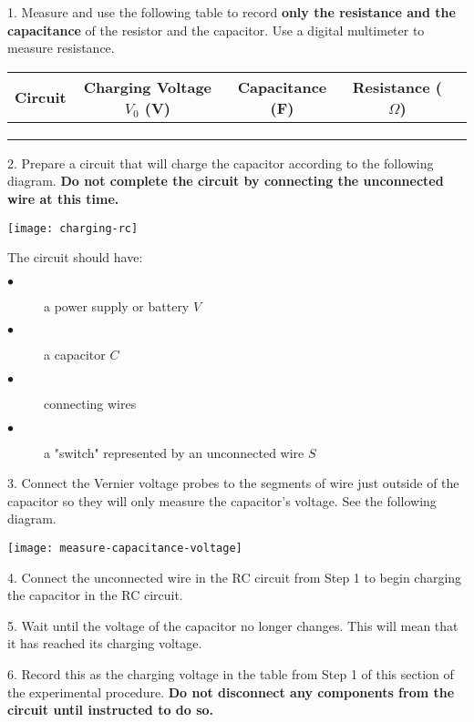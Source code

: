 \documentclass[12pt]{article}
\begin{document}
1. Measure and use the following table to record \textbf{only the resistance and the capacitance} of the resistor and the capacitor. Use a digital multimeter to measure resistance.

\begin{center}
\begin{tabular}{|c |c |c |c |c||}
 \hline
Circuit & Charging Voltage $V_0$ (V) & Capacitance (F) & Resistance ($\Omega$) \\ [0.5ex] 
 \hline\hline
 {} & {} & {} & {} \\ 
 \hline
 {} & {}  & {} & {} \\
 \hline
 {} & {}  & {} & {} \\ 
 \hline
\end{tabular}
\end{center}


2. Prepare a circuit that will charge the capacitor according to the following diagram. \textbf{Do not complete the circuit by connecting the unconnected wire at this time.}
\begin{center} \texttt{[image: charging-rc]} \\ \footnotesize \end{center}
The circuit should have:
\begin{description} 
\item[$\bullet$] a power supply or battery $V$
\item[$\bullet$] a capacitor $C$
\item[$\bullet$] connecting wires
\item[$\bullet$] a "switch" represented by an unconnected wire $S$
\end{description}


3. Connect the Vernier voltage probes to the segments of wire just outside of the capacitor so they will only measure the capacitor's voltage. See the following diagram.

\begin{center} \texttt{[image: measure-capacitance-voltage]} \\ \footnotesize \end{center}

4. Connect the unconnected wire in the RC circuit from Step 1 to begin charging the capacitor in the RC circuit. 

5. Wait until the voltage of the capacitor no longer changes. This will mean that it has reached its charging voltage. 

6. Record this as the charging voltage in the table from Step 1 of this section of the experimental procedure. \textbf{Do not disconnect any components from the circuit until instructed to do so.}
\end{document}
